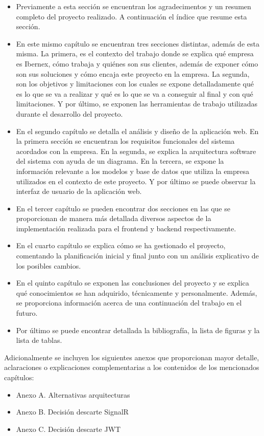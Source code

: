 \begin{itemize}
    \item Previamente a esta sección se encuentran los agradecimentos y un resumen completo del proyecto realizado. A continuación el índice que resume esta sección.
    \item En este mismo capítulo se encuentran tres secciones distintas, además de esta misma. La primera, es el contexto del trabajo donde se explica qué empresa es Ibernex, cómo trabaja y quiénes son sus clientes, además de exponer cómo son sus soluciones y cómo encaja este proyecto en la empresa. La segunda, son los objetivos y limitaciones con los cuales se expone detalladamente qué es lo que se va a realizar y qué es lo que se va a conseguir al final y con qué limitaciones. Y por último, se exponen las herramientas de trabajo utilizadas durante el desarrollo del proyecto.
    \item En el segundo capítulo se detalla el análisis y diseño de la aplicación web. En la primera sección se encuentran los requisitos funcionales del sistema acordados con la empresa. En la segunda, se explica la arquitectura software del sistema con ayuda de un diagrama. En la tercera, se expone la información relevante a los modelos y base de datos que utiliza la empresa utilizados en el contexto de este proyecto. Y por último se puede observar la interfaz de usuario de la aplicación web.
    \item En el tercer capítulo se pueden encontrar dos secciones en las que se proporcionan de manera más detallada diversos aspectos de la implementación realizada para el frontend y backend respectivamente.
    \item En el cuarto capítulo se explica cómo se ha gestionado el proyecto, comentando la planificación inicial y final junto con un análisis explicativo de los posibles cambios.
    \item En el quinto capítulo se exponen las conclusiones del proyecto y se explica qué conocimientos se han adquirido, técnicamente y personalmente. Además, se proporciona información acerca de una continuación del trabajo en el futuro.
    \item Por último se puede encontrar detallada la bibliografía, la lista de figuras y la lista de tablas.
\end{itemize}

\newpage
Adicionalmente se incluyen los siguientes anexos que proporcionan mayor detalle, aclaraciones o explicaciones complementarias a los contenidos de los mencionados capítulos:

\begin{itemize}
    \item Anexo A. Alternativas arquitecturas
    \item Anexo B. Decisión descarte SignalR
    \item Anexo C. Decisión descarte JWT
\end{itemize}
